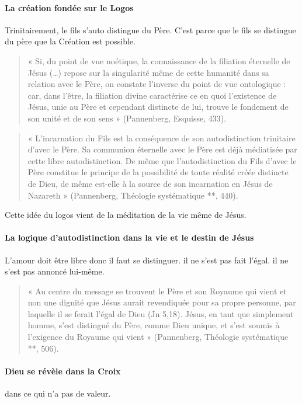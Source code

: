 \paragraph{La création fondée sur le Logos} Trinitairement, le fils s'auto distingue du Père. C'est parce que le fils se distingue du père que la Création est possible. 
\begin{quote}
    « Si, du point de vue noétique, la connaissance de la filiation éternelle de Jésus (…) repose
sur la singularité même de cette humanité dans sa relation avec le Père, on constate l’inverse
du point de vue ontologique : car, dans l’être, la filiation divine caractérise ce en quoi
l’existence de Jésus, unie au Père et cependant distincte de lui, trouve le fondement de son
unité et de son sens » (Pannenberg, Esquisse, 433).
\end{quote}
\begin{quote}
    « L’incarnation du Fils est la conséquence de son autodistinction trinitaire d’avec le Père. Sa
communion éternelle avec le Père est déjà médiatisée par cette libre autodistinction. De même
que l’autodistinction du Fils d’avec le Père constitue le principe de la possibilité de toute
réalité créée distincte de Dieu, de même est-elle à la source de son incarnation en Jésus de
Nazareth » (Pannenberg, Théologie systématique **, 440).
\end{quote}
Cette idée du logos vient de la méditation de la vie même de Jésus.


\paragraph{La logique d’autodistinction dans la vie et le destin de Jésus}  L'amour doit être libre donc il faut se distinguer. il ne s'est pas fait l'égal. il ne s'est pas annoncé lui-même. 

 \begin{quote}
     « Au centre du message se trouvent le Père et son Royaume qui vient et non une dignité que
Jésus aurait revendiquée pour sa propre personne, par laquelle il se ferait l’égal de Dieu (Jn
5,18). Jésus, en tant que simplement homme, s’est distingué du Père, comme Dieu unique, et
s’est soumis à l’exigence du Royaume qui vient » (Pannenberg, Théologie systématique **,
506).
 \end{quote}

\paragraph{Dieu se révèle dans la Croix} dans ce qui n'a pas de valeur. 


